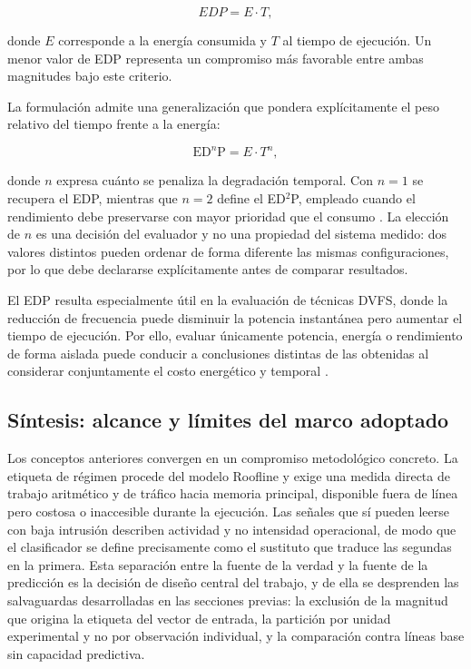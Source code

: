 \begin{equation}
    EDP = E \cdot T,
\end{equation}

donde $E$ corresponde a la energía consumida y $T$ al tiempo de ejecución.
Un menor valor de EDP representa un compromiso más favorable entre ambas
magnitudes bajo este criterio.

La formulación admite una generalización que pondera explícitamente el peso
relativo del tiempo frente a la energía:

\begin{equation}
    \mathrm{ED}^{n}\mathrm{P} = E \cdot T^{n},
    \label{eq:ednp}
\end{equation}

donde $n$ expresa cuánto se penaliza la degradación temporal. Con $n=1$ se
recupera el EDP, mientras que $n=2$ define el ED$^{2}$P, empleado cuando el
rendimiento debe preservarse con mayor prioridad que el consumo
\cite{Laros2013,Ali2023}. La elección de $n$ es una decisión del evaluador y no
una propiedad del sistema medido: dos valores distintos pueden ordenar de forma
diferente las mismas configuraciones, por lo que debe declararse explícitamente
antes de comparar resultados.

El EDP resulta especialmente útil en la evaluación de técnicas DVFS, donde la
reducción de frecuencia puede disminuir la potencia instantánea pero aumentar
el tiempo de ejecución. Por ello, evaluar únicamente potencia, energía o
rendimiento de forma aislada puede conducir a conclusiones distintas de las
obtenidas al considerar conjuntamente el costo energético y temporal
\cite{Ali2023,Laros2013}.

\subsection{Síntesis: alcance y límites del marco adoptado}
\label{sec:marco-sintesis}

Los conceptos anteriores convergen en un compromiso metodológico concreto. La
etiqueta de régimen procede del modelo Roofline y exige una medida directa de
trabajo aritmético y de tráfico hacia memoria principal, disponible fuera de
línea pero costosa o inaccesible durante la ejecución. Las señales que sí
pueden leerse con baja intrusión describen actividad y no intensidad
operacional, de modo que el clasificador se define precisamente como el
sustituto que traduce las segundas en la primera. Esta separación entre la
fuente de la verdad y la fuente de la predicción es la decisión de diseño
central del trabajo, y de ella se desprenden las salvaguardas desarrolladas en
las secciones previas: la exclusión de la magnitud que origina la etiqueta del
vector de entrada, la partición por unidad experimental y no por observación
individual, y la comparación contra líneas base sin capacidad predictiva.


